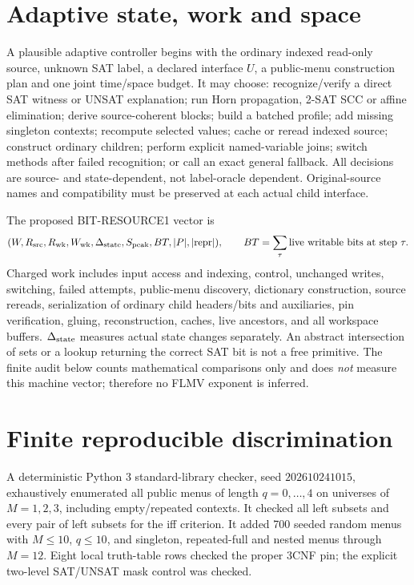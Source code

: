 \documentclass[11pt]{article}
\begin{document}
\section{Adaptive state, work and space}
A plausible adaptive controller begins with the ordinary
indexed read-only source, unknown SAT label, a declared
interface \(U\), a public-menu construction plan and one
joint time/space budget. It may choose:
recognize/verify a direct SAT witness or UNSAT explanation;
run Horn propagation, 2-SAT SCC or affine elimination;
derive source-coherent blocks; build a batched profile;
add missing singleton contexts; recompute selected values;
cache or reread indexed source; construct ordinary children;
perform explicit named-variable joins; switch methods after
failed recognition; or call an exact general fallback.
All decisions are source- and state-dependent, not label-oracle
dependent. Original-source names and compatibility must be
preserved at each actual child interface.

The proposed BIT-RESOURCE1 vector is
\[
 (W,R_{\rm src},R_{\rm wk},W_{\rm wk},\Delta_{\rm state},
 S_{\rm peak},BT,|P|,|{\rm repr}|),
 \qquad BT=\sum_\tau \text{live writable bits at step }\tau.
\]
Charged work includes input access and indexing, control,
unchanged writes, switching, failed attempts, public-menu
discovery, dictionary construction, source rereads,
serialization of ordinary child headers/bits and auxiliaries,
pin verification, gluing, reconstruction, caches, live
ancestors, and all workspace buffers. \(\Delta_{\rm state}\)
measures actual state changes separately. An abstract
intersection of sets or a lookup returning the correct SAT bit
is not a free primitive. The finite audit below counts
mathematical comparisons only and does \emph{not} measure
this machine vector; therefore no FLMV exponent is inferred.

\section{Finite reproducible discrimination}
A deterministic Python 3 standard-library checker,
seed \(202610241015\), exhaustively enumerated all public
menus of length \(q=0,\ldots,4\) on universes of
\(M=1,2,3\), including empty/repeated contexts.
It checked all left subsets and every pair of left subsets
for the iff criterion. It added 700 seeded random menus
with \(M\le10\), \(q\le10\), and singleton, repeated-full
and nested menus through \(M=12\).
Eight local truth-table rows checked the proper 3CNF pin;
the explicit two-level SAT/UNSAT mask control was checked.
\end{document}
